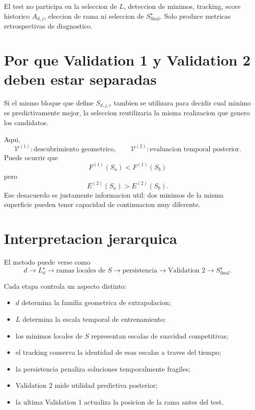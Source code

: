 \documentclass[11pt]{article}
\begin{document}
El test no participa en la seleccion de \(L\), deteccion de minimos, tracking,
score historico \(A_{d,j}\), eleccion de rama ni seleccion de
\(S_{\mathrm{final}}^\star\). Solo produce metricas retrospectivas de
diagnostico.

\section{Por que Validation 1 y Validation 2 deben estar separadas}

Si el mismo bloque que define \(S_{d,j,r}\) tambien se utilizara para decidir
cual minimo es predictivamente mejor, la seleccion reutilizaria la misma
realizacion que genero los candidatos.

Aqui,
\[
\mathcal{V}^{(1)}:
\text{descubrimiento geometrico},
\qquad
\mathcal{V}^{(2)}:
\text{evaluacion temporal posterior}.
\]
Puede ocurrir que
\[
F^{(1)}(S_a)<F^{(1)}(S_b)
\]
pero
\[
E^{(2)}(S_a)>E^{(2)}(S_b).
\]
Ese desacuerdo es justamente informacion util: dos minimos de la misma
superficie pueden tener capacidad de continuacion muy diferente.

\section{Interpretacion jerarquica}

El metodo puede verse como
\[
\boxed{
d
\to
L_d^\star
\to
\text{ramas locales de }S
\to
\text{persistencia}
\to
\text{Validation 2}
\to
S_{\mathrm{final}}^\star
}.
\]

Cada etapa controla un aspecto distinto:
\begin{itemize}[leftmargin=2em]
    \item \(d\) determina la familia geometrica de extrapolacion;
    \item \(L\) determina la escala temporal de entrenamiento;
    \item los minimos locales de \(S\) representan escalas de suavidad
    competitivas;
    \item el tracking conserva la identidad de esas escalas a traves del tiempo;
    \item la persistencia penaliza soluciones temporalmente fragiles;
    \item Validation 2 mide utilidad predictiva posterior;
    \item la ultima Validation 1 actualiza la posicion de la rama antes del test.
\end{itemize}
\end{document}
